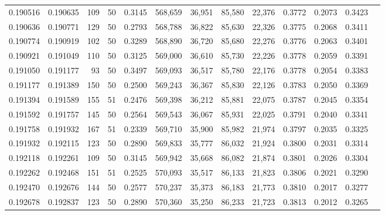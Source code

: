 \begin{tabular}{rrrrrrrrrrrrr}
0.190516 & 0.190635 &   109 &  50 &                                     0.3145 & 568,659 &  36,951 &  85,580 &  22,376 & 0.3772 & 0.2073 & 0.3423 \\
0.190636 & 0.190771 &   129 &  50 &                                     0.2793 & 568,788 &  36,822 &  85,630 &  22,326 & 0.3775 & 0.2068 & 0.3411 \\
0.190774 & 0.190919 &   102 &  50 &                                     0.3289 & 568,890 &  36,720 &  85,680 &  22,276 & 0.3776 & 0.2063 & 0.3401 \\
0.190921 & 0.191049 &   110 &  50 &                                     0.3125 & 569,000 &  36,610 &  85,730 &  22,226 & 0.3778 & 0.2059 & 0.3391 \\
0.191050 & 0.191177 &    93 &  50 &                                     0.3497 & 569,093 &  36,517 &  85,780 &  22,176 & 0.3778 & 0.2054 & 0.3383 \\
0.191177 & 0.191389 &   150 &  50 &                                     0.2500 & 569,243 &  36,367 &  85,830 &  22,126 & 0.3783 & 0.2050 & 0.3369 \\
0.191394 & 0.191589 &   155 &  51 &                                     0.2476 & 569,398 &  36,212 &  85,881 &  22,075 & 0.3787 & 0.2045 & 0.3354 \\
0.191592 & 0.191757 &   145 &  50 &                                     0.2564 & 569,543 &  36,067 &  85,931 &  22,025 & 0.3791 & 0.2040 & 0.3341 \\
0.191758 & 0.191932 &   167 &  51 &                                     0.2339 & 569,710 &  35,900 &  85,982 &  21,974 & 0.3797 & 0.2035 & 0.3325 \\
0.191932 & 0.192115 &   123 &  50 &                                     0.2890 & 569,833 &  35,777 &  86,032 &  21,924 & 0.3800 & 0.2031 & 0.3314 \\
0.192118 & 0.192261 &   109 &  50 &                                     0.3145 & 569,942 &  35,668 &  86,082 &  21,874 & 0.3801 & 0.2026 & 0.3304 \\
0.192262 & 0.192468 &   151 &  51 &                                     0.2525 & 570,093 &  35,517 &  86,133 &  21,823 & 0.3806 & 0.2021 & 0.3290 \\
0.192470 & 0.192676 &   144 &  50 &                                     0.2577 & 570,237 &  35,373 &  86,183 &  21,773 & 0.3810 & 0.2017 & 0.3277 \\
0.192678 & 0.192837 &   123 &  50 &                                     0.2890 & 570,360 &  35,250 &  86,233 &  21,723 & 0.3813 & 0.2012 & 0.3265 \\

\end{tabular}
